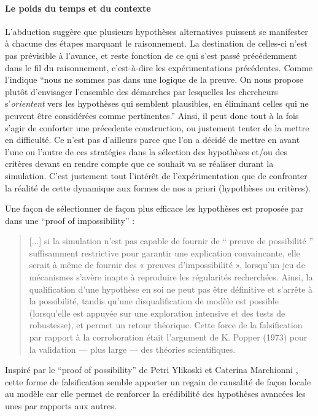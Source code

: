 \paragraph{Le poids du temps et du contexte }
\label{p:poids}



L'abduction suggère que plusieurs hypothèses alternatives puissent se manifester à chacune des étapes marquant le raisonnement. La destination de celles-ci n'est pas prévisible à l'avance, et reste fonction de ce qui s'est passé précédemment dans le fil du raisonnement, c'est-à-dire les expérimentations précédentes. Comme l'indique \textcite{Besse2000} \enquote{nous ne sommes pas dans une logique de la preuve. On nous propose plutôt d'envisager l'ensemble des démarches par lesquelles les chercheurs s'\textit{orientent} vers les hypothèses qui semblent plausibles, en éliminant celles qui ne peuvent être considérées comme pertinentes.} Ainsi, il peut donc tout à la fois s'agir de conforter une précedente construction, ou justement tenter de la mettre en difficulté. Ce n'est pas d'ailleurs parce que l'on a décidé de mettre en avant l'une ou l'autre de ces stratégies dans la sélection des hypothèses et/ou des critères devant en rendre compte que ce souhait va se réaliser durant la simulation. C'est justement tout l'intérêt de l'expérimentation que de confronter la réalité de cette dynamique aux formes de nos a priori (hypothèses ou critères).

Une façon de sélectionner de façon plus efficace les hypothèses est proposée par \textcite[300]{Cottineau2014b} dans une \foreignquote{english}{proof of impossibility} :

\blockquote[{\cite[300]{Cottineau2014b}}]{[...] si la simulation n’est pas capable de fournir de \enquote{ preuve de possibilité } suffisamment restrictive pour garantir une explication convaincante, elle serait à même de fournir des « preuves d’impossibilité », lorsqu’un jeu de mécanismes s’avère inapte à reproduire les régularités recherchées. Ainsi, la qualification d’une hypothèse en soi ne peut pas être définitive et s’arrête à la possibilité, tandis qu’une disqualification de modèle est possible (lorsqu’elle est appuyée sur une exploration intensive et des tests de robustesse), et permet un retour théorique. Cette force de la falsification par rapport à la corroboration était l’argument de K. Popper (1973) pour la validation — plus large — des théories scientifiques.}

Inspiré par le \foreignquote{english}{proof of possibility} de Petri Ylikoski et Caterina Marchionni \autocite{Marchionni2013}, cette forme de falsification  semble apporter un regain de causalité de façon locale au modèle car elle permet de renforcer la crédibilité des hypothèses avancées les unes par rapports aux autres.

